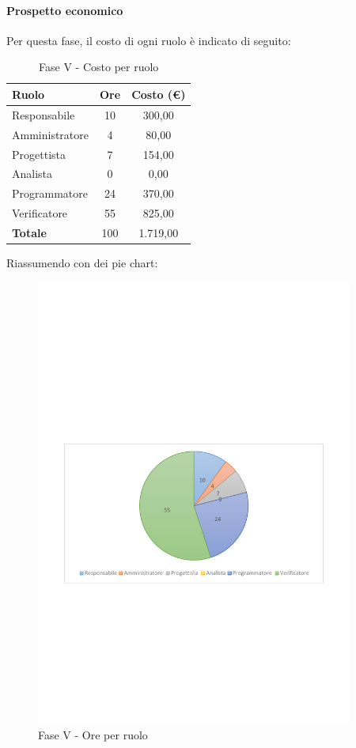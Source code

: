 \documentclass[../PianoProgetto.tex]{subfiles}
\begin{document}
	\paragraph{Prospetto economico}
					Per questa fase\g, il costo di ogni ruolo è indicato di seguito:
	\begin{table}[h]
		\centering
	
		\begin{tabular}{l * {2}{c}}
			\toprule
			\textbf{Ruolo} & \textbf{Ore} & \textbf{Costo (\euro{})} \\
			\midrule
			Responsabile &	10 &  300,00 \\
			Amministratore & 4 &  80,00 \\
			Progettista & 7 & 154,00 \\
			Analista & 0 & 0,00 \\
			Programmatore & 24 & 370,00 \\
			Verificatore & 55 & 825,00 \\
			\midrule		
			\textbf{Totale} & 100 & 1.719,00 \\
			\bottomrule	
		\end{tabular}
		\caption{Fase V - Costo per ruolo}
		\label{tab:faseV_costo}
	\end{table}
\vfill	
	Riassumendo con dei pie chart:
	\begin{figure}[!h]
		\centering
		\includegraphics[width=0.93\textwidth , trim=2cm 9.5cm 2cm 11cm]{grafici/V/V-ore-ruolo}
			\caption{Fase V - Ore per ruolo}
		\label{fig:CircleChart-faseV_ore_r}
	\end{figure}
\end{document}
